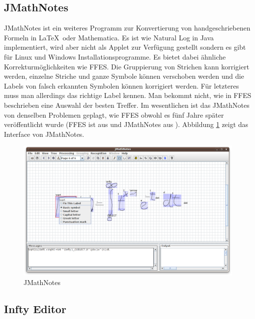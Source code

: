 \subsection{JMathNotes}

JMathNotes ist ein weiteres Programm zur Konvertierung von handgeschriebenen Formeln in \LaTeX~oder Mathematica.  Es ist wie Natural Log in Java implementiert, wird aber nicht als Applet zur Verfügung gestellt sondern es gibt für Linux und Windows Installationsprogramme. Es bietet dabei ähnliche Korrekturmöglichkeiten wie FFES. Die Gruppierung von Strichen kann korrigiert werden, einzelne Striche und ganze Symbole können verschoben werden und die Labels von falsch erkannten Symbolen können korrigiert werden. Für letzteres muss man allerdings das richtige Label kennen. Man bekommt nicht, wie in FFES beschrieben eine Auswahl der besten Treffer.
Im wesentlichen ist das JMathNotes von denselben Problemen geplagt, wie FFES obwohl es fünf Jahre später veröffentlicht wurde (FFES ist aus \citeyear{Matasakis:1999p9465} und JMathNotes aus \citeyear{jmathnotes}). Abbildung \ref{fig:jmathnotes} zeigt das Interface von JMathNotes.

\begin{figure}[htbp]
  \begin{center}
    \includegraphics[width=\textwidth]{figures/jmathnotes.png}
  \end{center}
  \caption{JMathNotes}
  \label{fig:jmathnotes}
\end{figure}

\subsection{Infty Editor}

